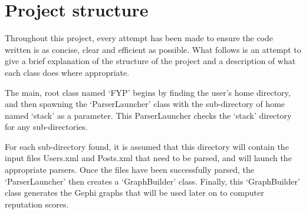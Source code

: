 \documentclass[]{final_report}
\begin{document}
\section{Project structure}

Throughout this project, every attempt has been made to ensure the code written is as concise, clear and efficient as possible. What follows is an attempt to give a brief explanation of the structure of the project and a description of what each class does where appropriate. 

The main, root class named `FYP' begins by finding the user's home directory, and then spawning the `ParserLauncher' class with the sub-directory of home named `stack' as a parameter. This ParserLauncher checks the `stack' directory for any sub-directories. 

For each sub-directory found, it is assumed that this directory will contain the input files Users.xml and Posts.xml that need to be parsed, and will launch the appropriate parsers. Once the files have been successfully parsed, the `ParserLauncher' then creates a `GraphBuilder' class. Finally, this `GraphBuilder' class generates the Gephi graphs that will be used later on to computer reputation scores.
\end{document}
